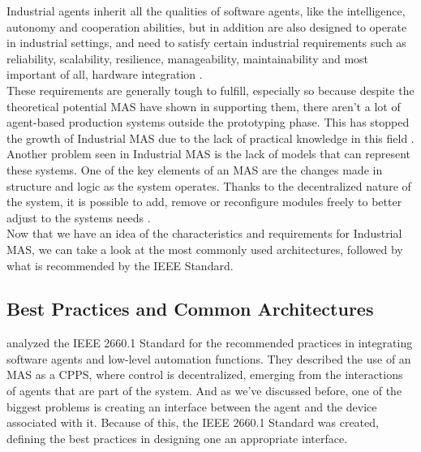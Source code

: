 Industrial agents inherit all the qualities of software agents, like the intelligence, autonomy and cooperation abilities, but in addition are also designed to operate in industrial settings, and need to satisfy certain industrial requirements such as reliability, scalability, resilience, manageability, maintainability and most important of all, hardware integration \cite{Leitao2021}.\\

These requirements are generally tough to fulfill, especially so because despite the theoretical potential MAS have shown in supporting them, there aren't a lot of agent-based production systems outside the prototyping phase. This has stopped the growth of Industrial MAS due to the lack of practical knowledge in this field \cite{Karnouskos2019}. Another problem seen in Industrial MAS is the lack of models that can represent these systems. One of the key elements of an MAS are the changes made in structure and logic as the system operates. Thanks to the decentralized nature of the system, it is possible to add, remove or reconfigure modules freely to better adjust to the systems needs \cite{Karnouskos2019}.\\

Now that we have an idea of the characteristics and requirements for Industrial MAS, we can take a look at the most commonly used architectures, followed by what is recommended by the IEEE Standard.

\subsection{Best Practices and Common Architectures}
\label{subsec:best_practices_and_common_architectures}

\citeauthor{Leitao2021} \cite{Leitao2021} analyzed the IEEE 2660.1 Standard for the recommended practices in integrating software agents and low-level automation functions. They described the use of an MAS as a CPPS, where control is decentralized, emerging from the interactions of agents that are part of the system. And as we've discussed before, one of the biggest problems is creating an interface between the agent and the device associated with it. Because of this, the IEEE 2660.1 Standard was created, defining the best practices in designing one an appropriate interface.\\

